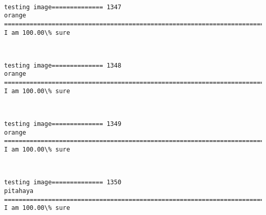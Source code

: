 \documentclass[11pt]{article}
\begin{document}
    \begin{center}
    \end{center}
    { \hspace*{\fill} \\}
    
    \begin{Verbatim}[commandchars=\\\{\}]
testing image============== 1347
orange
============================================================================
I am 100.00\% sure

    \end{Verbatim}

    \begin{center}
    \end{center}
    { \hspace*{\fill} \\}
    
    \begin{Verbatim}[commandchars=\\\{\}]
testing image============== 1348
orange
============================================================================
I am 100.00\% sure

    \end{Verbatim}

    \begin{center}
    \end{center}
    { \hspace*{\fill} \\}
    
    \begin{Verbatim}[commandchars=\\\{\}]
testing image============== 1349
orange
============================================================================
I am 100.00\% sure

    \end{Verbatim}

    \begin{center}
    \end{center}
    { \hspace*{\fill} \\}
    
    \begin{Verbatim}[commandchars=\\\{\}]
testing image============== 1350
pitahaya
============================================================================
I am 100.00\% sure

    \end{Verbatim}
\end{document}
